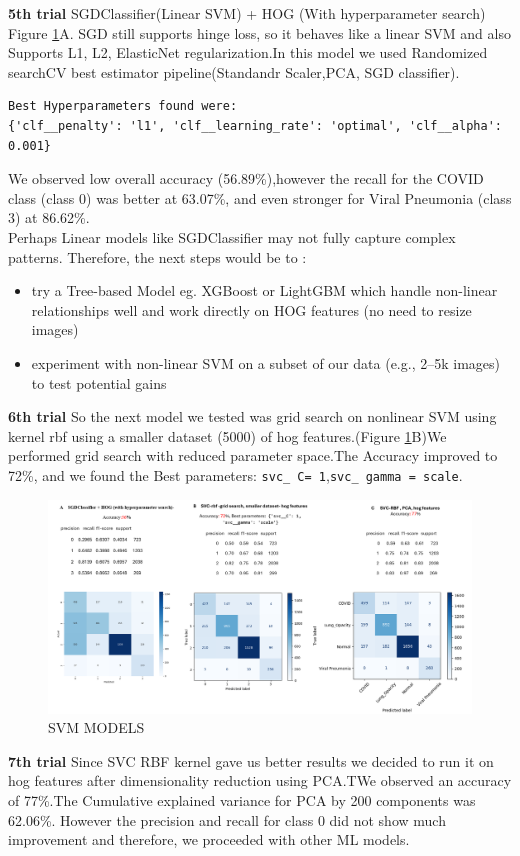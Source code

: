 \documentclass{article}
\begin{document}
\textbf{5th trial }SGDClassifier(Linear SVM) + HOG (With hyperparameter search) Figure \ref{fig:SVM_MODELS}A. SGD still supports hinge loss, so it behaves like a linear SVM and also Supports L1, L2, ElasticNet regularization.In this model we used Randomized searchCV best estimator pipeline(Standandr Scaler,PCA, SGD classifier). \begin{verbatim}
Best Hyperparameters found were:
{'clf__penalty': 'l1', 'clf__learning_rate': 'optimal', 'clf__alpha': 0.001}
\end{verbatim}
We observed low overall accuracy (56.89\%),however the recall for the COVID class (class 0) was better at 63.07\%, and even stronger for Viral Pneumonia (class 3) at 86.62\%.\\
Perhaps Linear models like SGDClassifier may not fully capture complex patterns.
Therefore, the next steps would be to :
\begin{itemize}
    \item try a Tree-based Model eg. XGBoost or LightGBM which handle non-linear relationships well and work directly on HOG features (no need to resize images)
    \item experiment with non-linear SVM on a subset of our data (e.g., 2–5k images) to test potential gains
\end{itemize}
\textbf{6th trial }So the next model we tested was grid search on nonlinear SVM using kernel rbf using a smaller dataset (5000) of hog features.(Figure \ref{fig:SVM_MODELS}B)We performed grid search with reduced parameter space.The Accuracy improved to 72\%, and we found the Best parameters: \texttt{svc\_ C= 1},\texttt {svc\_ gamma = scale}.
\\
\begin{figure}[htb!] %
    \centering
    \includegraphics[width=1.0\linewidth]{svm ABC.png}
    \caption{SVM MODELS}
    \label{fig:SVM_MODELS}
\end{figure}
\textbf{7th trial }Since SVC\- RBF kernel gave us better results we decided to run it on hog features after dimensionality reduction using PCA.TWe observed an accuracy of 77\%.The Cumulative explained variance for PCA by 200 components was 62.06\%. However the precision and recall for class 0 did not show much improvement and therefore, we proceeded with other ML models.\\
\end{document}
